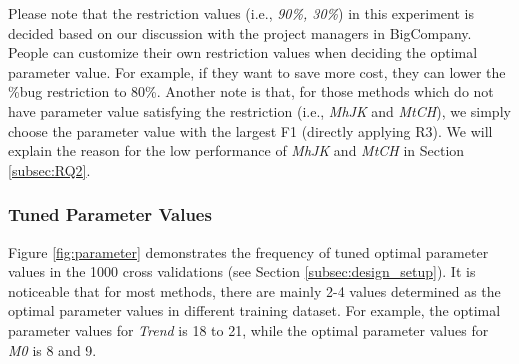 \documentclass[sigconf,review, anonymous]{acmart}
\newcommand{\company}{BigCompany}
\begin{document}


Please note that the restriction values (i.e., \textit{90\%, 30\%}) in this experiment is decided based on our discussion with the project managers in {\company}.
People can customize their own restriction values when deciding the optimal parameter value.
For example, if they want to save more cost, they can lower the \%bug restriction to 80\%.
Another note is that, for those methods which do not have parameter value satisfying the restriction (i.e., \textit{MhJK} and \textit{MtCH}), we simply choose the parameter value with the largest F1 (directly applying R3).
We will explain the reason for the low performance of \textit{MhJK} and \textit{MtCH} in Section \ref{subsec:RQ2}.



\subsubsection{\textbf{Tuned Parameter Values}}
\label{subsubsec:RQ1-3}


Figure \ref{fig:parameter} demonstrates the frequency of tuned optimal parameter values in the 1000 cross validations (see Section \ref{subsec:design_setup}).
It is noticeable that for most methods, there are mainly 2-4 values determined as the optimal parameter values in different training dataset.
For example, the optimal parameter values for \textit{Trend} is 18 to 21, while the optimal parameter values for \textit{M0} is 8 and 9.
\end{document}
